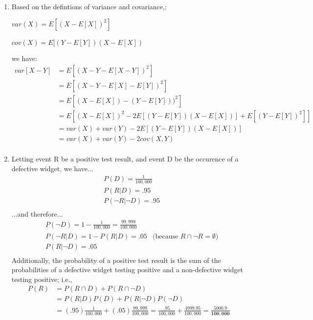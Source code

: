 \documentclass{report}
\begin{document}
\begin{enumerate}
	\item Based on the defintions of variance and covariance,:\\
	\centerline{$var(X) = E[(X - E[X])^2]$}
	\centerline{$cov(X) = E[(Y - E[Y])(X - E[X])$}
	we have:
	\begin{align*}
    var[X-Y] &= E[( X - Y - E[X - Y])^2]  \\
    	 	 &= E[( X - Y - E[X] - E[Y])^2] \\
    	 	 &= E[( X - E[X]) - (Y - E[Y]) )^2] \\
    	 	 &= E[( X - E[X])^2 - 2E[(Y - E[Y])(X - E[X])] + E[(Y - E[Y])^2]] \\
    	 	 &= var(X) + var(Y) - 2E[(Y - E[Y])(X - E[X])] \\
    	 	 &= var(X) + var(Y) - 2cov(X,Y ) \\
    \end{align*}
	\item Letting event R be a positive test result, and event D be the occurence of a defective widget, we have...
	\begin{align*}
	     & P(D) = \frac{1}{100,000} \\
	     & P(R \vert D) = .95  \\
	     & P(\lnot R \vert \lnot D) = .95 \\
	 \end{align*}
	    ...and therefore...
	    \begin{align*}
	     & P(\lnot D) 				= 1 - \frac{1}{100,000} = \frac{99,999}{100,000} \\
	     & P(\lnot R \vert 		D) 	= 1-  P(R \vert D) =.05  & 
	     \text{(because $R \cap \lnot R = \emptyset$)}\\
	     & P(R 		\vert \lnot D) 	= .05  \\
	 	\end{align*}
	 	Additionally, the probability of a positive test result is the sum of the probabilities of a  defective widget testing positive and a non-defective widget testing positive; i.e.,
	 	\begin{align*}
	 	 P(R) 	&= P(R \cap D) + P(R \cap \lnot D)\\
	 	 		&= P(R \vert D)P(D) + P(R \vert \lnot D)P(\lnot D) \\
	 	 		&= (.95)\frac{1}{100,000} + (.05)\frac{99,999}{100,000} 
	 	 		 = \frac{.95}{100,000} + \frac{4999.95}{100,000} 
	 	 		 = \mathbf{\frac{5000.9}{100,000}}\\
	    \end{align*}
	    

\end{enumerate}
\end{document}
